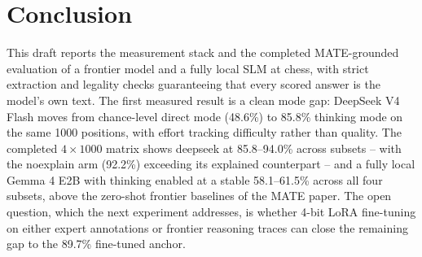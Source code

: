 \documentclass{article}
\begin{document}
\section{Conclusion}
\label{sec:conclusion}
This draft reports the measurement stack and the completed
MATE-grounded evaluation of a frontier model and a fully local SLM at
chess, with strict extraction and legality checks guaranteeing that
every scored answer is the model's own text. The first measured result
is a clean mode gap: DeepSeek V4 Flash moves from chance-level direct
mode (48.6\%) to 85.8\% thinking mode on the same 1000 positions, with
effort tracking difficulty rather than quality. The completed
$4\times1000$ matrix shows deepseek at 85.8--94.0\% across subsets --
with the noexplain arm (92.2\%) exceeding its explained counterpart --
and a fully local Gemma 4 E2B with thinking enabled at a stable
58.1--61.5\% across all four subsets, above the zero-shot frontier
baselines of the MATE paper. The open question, which the next
experiment addresses, is whether 4-bit LoRA fine-tuning on either
expert annotations or frontier reasoning traces can close the
remaining gap to the 89.7\% fine-tuned anchor.



\end{document}
